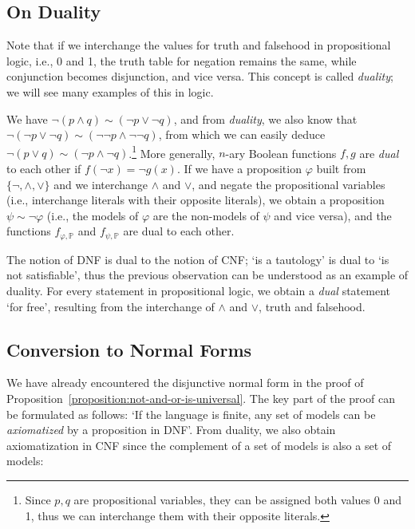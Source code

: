 \subsection{On Duality}

Note that if we interchange the values for truth and falsehood in propositional logic, i.e., 0 and 1, the truth table for negation remains the same, while conjunction becomes disjunction, and vice versa. This concept is called \emph{duality}; we will see many examples of this in logic.

We have $\neg(p \land q) \sim (\neg p \lor \neg q)$, and from \emph{duality}, we also know that $\neg(\neg p \lor \neg q) \sim (\neg \neg p \land \neg \neg q)$, from which we can easily deduce $\neg(p \lor q) \sim (\neg p \land \neg q)$.\footnote{Since $p,q$ are propositional variables, they can be assigned both values 0 and 1, thus we can interchange them with their opposite literals.} More generally, $n$-ary Boolean functions $f, g$ are \emph{dual} to each other if $f(\neg x) = \neg g(x)$. If we have a proposition $\varphi$ built from $\{\neg, \land, \lor\}$ and we interchange $\land$ and $\lor$, and negate the propositional variables (i.e., interchange literals with their opposite literals), we obtain a proposition $\psi \sim \neg \varphi$ (i.e., the models of $\varphi$ are the non-models of $\psi$ and vice versa), and the functions $f_{\varphi, \mathbb{P}}$ and $f_{\psi, \mathbb{P}}$ are dual to each other.

The notion of DNF is dual to the notion of CNF; `is a tautology' is dual to `is not satisfiable', thus the previous observation can be understood as an example of duality. For every statement in propositional logic, we obtain a \emph{dual} statement `for free', resulting from the interchange of $\land$ and $\lor$, truth and falsehood.


\subsection{Conversion to Normal Forms}\label{subsection:convert-to-normal-form}

We have already encountered the disjunctive normal form in the proof of Proposition~\ref{proposition:not-and-or-is-universal}. The key part of the proof can be formulated as follows: `If the language is finite, any set of models can be \emph{axiomatized} by a proposition in DNF'. From duality, we also obtain axiomatization in CNF since the complement of a set of models is also a set of models:

